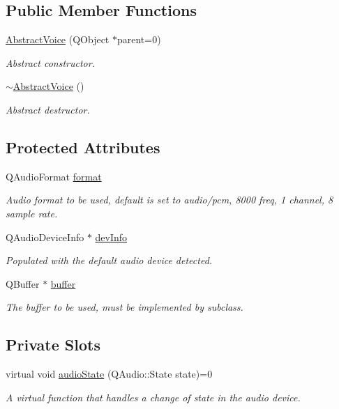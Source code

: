 \subsection*{\-Public \-Member \-Functions}
\begin{DoxyCompactItemize}
\item 
\hyperlink{class_abstract_voice_a6b3c93369820d5e9e65f596dcf2147be}{\-Abstract\-Voice} (\-Q\-Object $\ast$parent=0)
\begin{DoxyCompactList}\small\item\em \-Abstract constructor. \end{DoxyCompactList}\item 
\hyperlink{class_abstract_voice_a93d6515cf6e84cad397efe6b339a1b0c}{$\sim$\-Abstract\-Voice} ()
\begin{DoxyCompactList}\small\item\em \-Abstract destructor. \end{DoxyCompactList}\end{DoxyCompactItemize}
\subsection*{\-Protected \-Attributes}
\begin{DoxyCompactItemize}
\item 
\-Q\-Audio\-Format \hyperlink{class_abstract_voice_aa8718f0af1669ef7a84347c2d9a54cf9}{format}
\begin{DoxyCompactList}\small\item\em \-Audio format to be used, default is set to audio/pcm, 8000 freq, 1 channel, 8 sample rate. \end{DoxyCompactList}\item 
\-Q\-Audio\-Device\-Info $\ast$ \hyperlink{class_abstract_voice_ac27882c5cb69564cbc4d5cca7847a359}{dev\-Info}
\begin{DoxyCompactList}\small\item\em \-Populated with the default audio device detected. \end{DoxyCompactList}\item 
\-Q\-Buffer $\ast$ \hyperlink{class_abstract_voice_a93b7c2b08aa97b77b8126a8dff173018}{buffer}
\begin{DoxyCompactList}\small\item\em \-The buffer to be used, must be implemented by subclass. \end{DoxyCompactList}\end{DoxyCompactItemize}
\subsection*{\-Private \-Slots}
\begin{DoxyCompactItemize}
\item 
virtual void \hyperlink{class_abstract_voice_a4c8d0cafd33f068899f8700f00e93347}{audio\-State} (\-Q\-Audio\-::\-State state)=0
\begin{DoxyCompactList}\small\item\em \-A virtual function that handles a change of state in the audio device. \end{DoxyCompactList}\end{DoxyCompactItemize}


